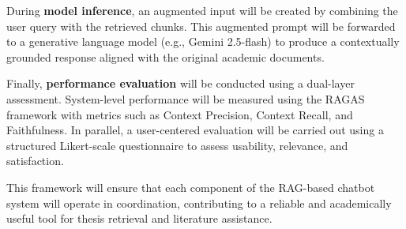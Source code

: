 \begin{refsection}
During \textbf{model inference}, an augmented input will be created by combining the user query with the retrieved chunks. This augmented prompt will be forwarded to a generative language model (e.g., Gemini 2.5-flash) to produce a contextually grounded response aligned with the original academic documents.

Finally, \textbf{performance evaluation} will be conducted using a dual-layer assessment. System-level performance will be measured using the RAGAS framework with metrics such as Context Precision, Context Recall, and Faithfulness. In parallel, a user-centered evaluation will be carried out using a structured Likert-scale questionnaire to assess usability, relevance, and satisfaction.

This framework will ensure that each component of the RAG-based chatbot system will operate in coordination, contributing to a reliable and academically useful tool for thesis retrieval and literature assistance.

\clearpage

\printbibliography[heading=subbibintoc, title={\centering Notes}]
\end{refsection}
